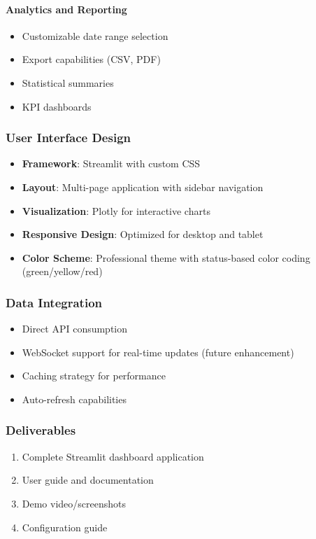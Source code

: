 \documentclass[12pt,a4paper]{article}
\begin{document}
\paragraph{Analytics and Reporting}
\begin{itemize}[leftmargin=*]
    \item Customizable date range selection
    \item Export capabilities (CSV, PDF)
    \item Statistical summaries
    \item KPI dashboards
\end{itemize}

\subsubsection{User Interface Design}
\begin{itemize}[leftmargin=*]
    \item \textbf{Framework}: Streamlit with custom CSS
    \item \textbf{Layout}: Multi-page application with sidebar navigation
    \item \textbf{Visualization}: Plotly for interactive charts
    \item \textbf{Responsive Design}: Optimized for desktop and tablet
    \item \textbf{Color Scheme}: Professional theme with status-based color coding (green/yellow/red)
\end{itemize}

\subsubsection{Data Integration}
\begin{itemize}[leftmargin=*]
    \item Direct API consumption
    \item WebSocket support for real-time updates (future enhancement)
    \item Caching strategy for performance
    \item Auto-refresh capabilities
\end{itemize}

\subsubsection{Deliverables}
\begin{enumerate}
    \item Complete Streamlit dashboard application
    \item User guide and documentation
    \item Demo video/screenshots
    \item Configuration guide
\end{enumerate}
\end{document}
